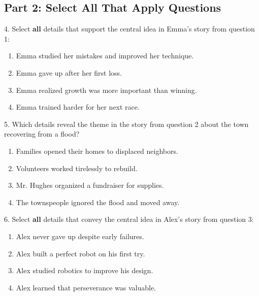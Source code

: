\documentclass[12pt]{article}
\begin{document}
\vspace{1cm}

\subsection*{Part 2: Select All That Apply Questions}

4. Select \textbf{all} details that support the central idea in Emma’s story from question 1:  
\begin{enumerate}[label=\Alph*.]
    \item Emma studied her mistakes and improved her technique.  
    \item Emma gave up after her first loss.  
    \item Emma realized growth was more important than winning.  
    \item Emma trained harder for her next race.  
\end{enumerate}

\vspace{1cm}

5. Which details reveal the theme in the story from question 2 about the town recovering from a flood?  
\begin{enumerate}[label=\Alph*.]
    \item Families opened their homes to displaced neighbors.  
    \item Volunteers worked tirelessly to rebuild.  
    \item Mr. Hughes organized a fundraiser for supplies.  
    \item The townspeople ignored the flood and moved away.  
\end{enumerate}

\vspace{1cm}

6. Select \textbf{all} details that convey the central idea in Alex’s story from question 3:  
\begin{enumerate}[label=\Alph*.]
    \item Alex never gave up despite early failures.  
    \item Alex built a perfect robot on his first try.  
    \item Alex studied robotics to improve his design.  
    \item Alex learned that perseverance was valuable.  
\end{enumerate}

\vspace{1cm}
\newpage
\end{document}
